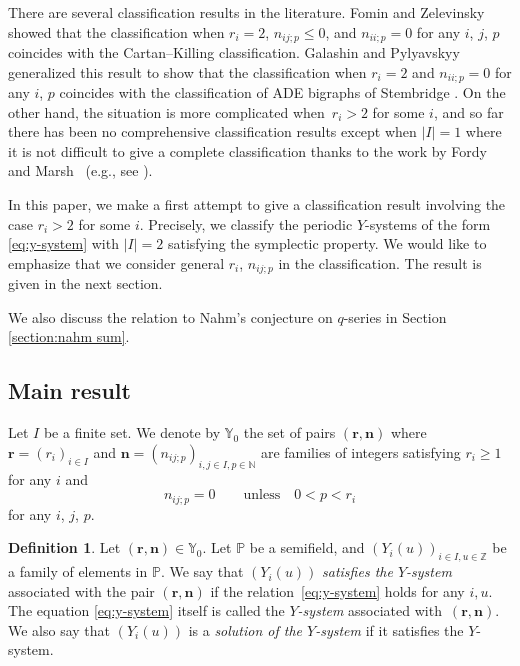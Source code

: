 \documentclass[10pt,a4paper]{amsart}
\numberwithin{equation}{section}
\theoremstyle{definition}
\newtheorem{Definition}[Theorem]{Definition}
\begin{document}
There are several classification results in the literature.
Fomin and Zelevinsky \cite{FZ4} showed that the classification when $r_i = 2$, $n_{ij;p} \leq 0$, and $n_{ii;p} = 0$ for any $i$, $j$, $p$
coincides with the Cartan--Killing classification. Galashin and Pylyavskyy \cite{GalashinPylyavskyy} generalized this result to show that
the classification when $r_i = 2$ and $n_{ii;p} = 0$ for any $i$, $p$ coincides with the classification of ADE bigraphs of Stembridge \cite{Stembridge}.
On the other hand, the situation is more complicated when~${r_i > 2}$ for some $i$, and so far there has been no comprehensive classification results
except when $\lvert I \rvert = 1$ where it is not difficult to give a complete classification
thanks to the work by Fordy and Marsh~\cite{FordyMarsh} (e.g., see \cite[Example 5.6]{mizuno2020difference}).

In this paper, we make a first attempt to give a classification result involving the case $r_i > 2$ for some $i$.
Precisely, we classify the periodic $Y$-systems of the form \eqref{eq:y-system} with $\lvert I \rvert = 2$ satisfying the symplectic property.
We would like to emphasize that we consider general $r_i$, $n_{ij;p}$ in the classification.
The result is given in the next section.

We also discuss the relation to Nahm's conjecture on $q$-series \cite{Nahm, Zagier}
in Section \ref{section:nahm sum}.

\subsection{Main result}\label{section:main relsult}
Let $I$ be a finite set.
We denote by $\mathbb{Y}_0$ the set of pairs $(\bm{r}, \bm{n})$ where $\bm{r} = (r_i)_{i \in I}$ and $\bm{n} = (n_{ij;p})_{i, j \in I, p \in \mathbb{N}}$
are families of integers satisfying $r_i \geq 1$ for any $i$ and
\begin{equation}\label{eq:Y1}
n_{ij;p} = 0\qquad \text{unless} \quad 0 < p < r_i
\end{equation}
for any $i$, $j$, $p$.

\begin{Definition}
 Let $(\bm{r}, \bm{n}) \in \mathbb{Y}_0$.
 Let $\mathbb{P}$ be a semifield, and $(Y_i(u))_{i \in I, u \in \mathbb{Z}}$ be a family of
 elements in $\mathbb{P}$.
 We say that $(Y_i(u))$ \emph{satisfies the $Y$-system} associated with the pair $(\bm{r}, \bm{n})$ if the relation~\eqref{eq:y-system}
 holds for any $i,u$.
 The equation \eqref{eq:y-system} itself is called the \emph{$Y$-system} associated with~$(\bm{r}, \bm{n})$.
 We also say that $(Y_i(u))$ is a \emph{solution of the $Y$-system} if it satisfies the $Y$-system.
\end{Definition}
\end{document}

